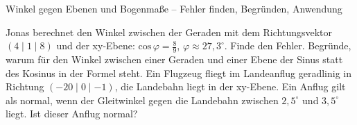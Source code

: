 \begin{aufgabe}{Winkel gegen Ebenen und Bogenmaße – Fehler finden, Begründen, Anwendung}
\begin{teile}
\teil Jonas berechnet den Winkel zwischen der Geraden mit dem Richtungsvektor $(4 \mid 1 \mid 8)$ und der xy-Ebene: $\mathrm{cos}\,\varphi = \frac{8}{9}$, $\varphi \approx 27{,}3^\circ$. Finde den Fehler.
\teil Begründe, warum für den Winkel zwischen einer Geraden und einer Ebene der Sinus statt des Kosinus in der Formel steht.
\teil Ein Flugzeug fliegt im Landeanflug geradlinig in Richtung $(-20 \mid 0 \mid -1)$, die Landebahn liegt in der xy-Ebene. Ein Anflug gilt als normal, wenn der Gleitwinkel gegen die Landebahn zwischen $2{,}5^\circ$ und $3{,}5^\circ$ liegt. Ist dieser Anflug normal?
\end{teile}
\end{aufgabe}
